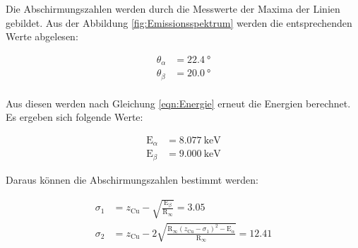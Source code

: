 Die Abschirmungszahlen werden durch die Messwerte der Maxima der Linien gebildet.
Aus der Abbildung \ref{fig:Emissionsspektrum} werden die entsprechenden Werte abgelesen:

\begin{align*}
  \theta_{\alpha} &= \SI{22.4}{\degree} \\
  \theta_{\beta} &= \SI{20.0}{\degree} \\
\end{align*}

Aus diesen werden nach Gleichung \eqref{eqn:Energie} erneut die Energien berechnet.
Es ergeben sich folgende Werte:

\begin{align*}
  \text{E}_{\alpha} &= \SI{8.077}{\kilo\electronvolt} \\
  \text{E}_{\beta} &= \SI{9.000}{\kilo\electronvolt}
\end{align*}

Daraus können die Abschirmungszahlen bestimmt werden:

\begin{align*}
  \sigma_1 &= z_\text{Cu} - \sqrt{\frac{\text{E}_{\beta}}{\text{R}_{\infty}}} = 3.05\\
  \sigma_2 &= z_\text{Cu} - 2\sqrt{\frac{\text{R}_{\infty} \left(z_\text{Cu} - \sigma_1 \right)^2 - \text{E}_{\alpha}}{\text{R}_{\infty}}} = 12.41
\end{align*}
